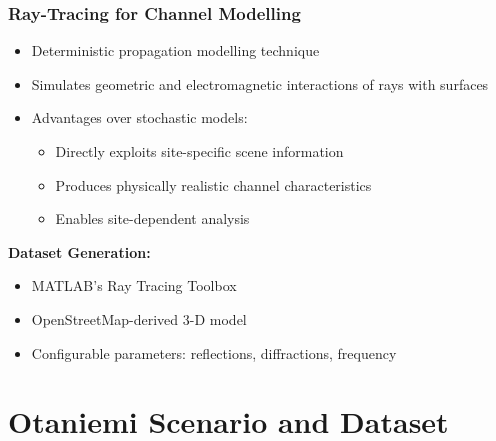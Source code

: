 \documentclass{beamer}
\begin{document}
\begin{frame}
\frametitle{Ray-Tracing for Channel Modelling}
\begin{itemize}
  \item Deterministic propagation modelling technique
  \item Simulates geometric and electromagnetic interactions of rays with surfaces
  \item Advantages over stochastic models:
  \begin{itemize}
    \item Directly exploits site-specific scene information
    \item Produces physically realistic channel characteristics
    \item Enables site-dependent analysis
  \end{itemize}
\end{itemize}

\vspace{0.5cm}
\textbf{Dataset Generation:}
\begin{itemize}
  \item MATLAB's Ray Tracing Toolbox
  \item OpenStreetMap-derived 3-D model
  \item Configurable parameters: reflections, diffractions, frequency
\end{itemize}
\end{frame}

\section{Otaniemi Scenario and Dataset}
\end{document}
